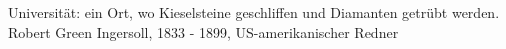 {Universität: ein Ort, wo Kieselsteine geschliffen und Diamanten getrübt werden.}
{Robert Green Ingersoll, 1833 - 1899, US-amerikanischer Redner}





